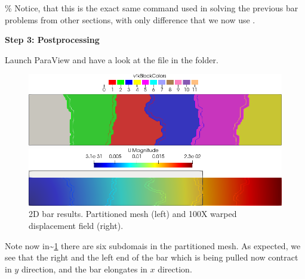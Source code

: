 \% Notice, that this is the exact same command used in solving the
previous bar problems from other sections, with only difference that we
now use .

\textbf{Step 3: Postprocessing}

Launch ParaView and have a look at the  file in the
 folder.

\begin{figure}[htbp]
    \centering
    \begin{minipage}[t][2cm][t]{0.36\textwidth}
    \includegraphics[align=b,width=1\textwidth]{./Images/2d-bar-partitioned6.png}
    \end{minipage}\hspace{.1\textwidth}
    \begin{minipage}[t][2cm][t]{0.5\textwidth}
    \includegraphics[align=b,width=1\textwidth]{./Images/2d-bar-clamped-traction-point.png}
    \end{minipage}
    \caption{2D bar results. Partitioned mesh (left) and 100X warped displacement field (right).}
    \label{fig:6part}
\end{figure}

Note now in\textasciitilde{}\cref{fig:6part} there are six subdomais in
the partitioned mesh. As expected, we see that the right and the left
end of the bar which is being pulled now contract in \(y\) direction,
and the bar elongates in \(x\) direction.
